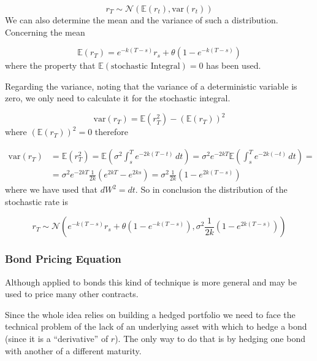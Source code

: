 \begin{equation*}
r_T \sim \mathcal{N}(\mathbb{E}(r_t), \textrm{var}(r_t))
\end{equation*}
We can also determine the mean and the variance of such a distribution.
Concerning the mean

\begin{equation}
\mathbb{E}(r_T)=e^{-k(T-s)} r_s+\theta\left(1-e^{-k(T-s)}\right)
\end{equation}
where the property that $\mathbb{E}(\textrm{stochastic~Integral}) = 0$ has been used.

Regarding the variance, noting that the variance of a deterministic variable is zero, we only need to calculate it for the stochastic integral. %

\begin{equation*}
\textrm{var}(r_T)=\mathbb{E}(r^2_T)-(\mathbb{E}(r_T))^2
\end{equation*}
where $(\mathbb{E}(r_T))^2 = 0$ therefore

\begin{equation}
\begin{aligned}
\textrm{var}(r_T)&=\mathbb{E}(r^2_T)=\mathbb{E}(\sigma^2 \int^T_s e^{-2k(T-t)}\,dt)=\sigma^2 e^{-2kT} \mathbb{E}( \int^T_s e^{-2k(-t)}\,dt)=\\
&=\sigma^2 e^{-2kT} \frac {1}{2k}(e^{2kT}-e^{2ks})=\sigma^2 \frac {1}{2k}(1-e^{2k(T-s)}) 
\end{aligned}
\end{equation}
where we have used that $dW^2 = dt$.
So in conclusion the distribution of the stochastic rate is

\begin{equation}
r_T \sim \mathcal{N}(e^{-k(T-s)} r_s+\theta(1-e^{-k(T-s)}),\sigma^2 \frac {1}{2k}(1-e^{2k(T-s)}))
\end{equation}

\subsubsection{Bond Pricing Equation}\label{bond-pricing-equation}

Although applied to bonds this kind of technique is more general and may be used to price many other contracts.

Since the whole idea relies on building a hedged portfolio we need to face the technical problem of the lack of an underlying asset with which
to hedge a bond (since it is a ``derivative'' of $r$). The only way to do that is by hedging one bond with another of a different maturity.

